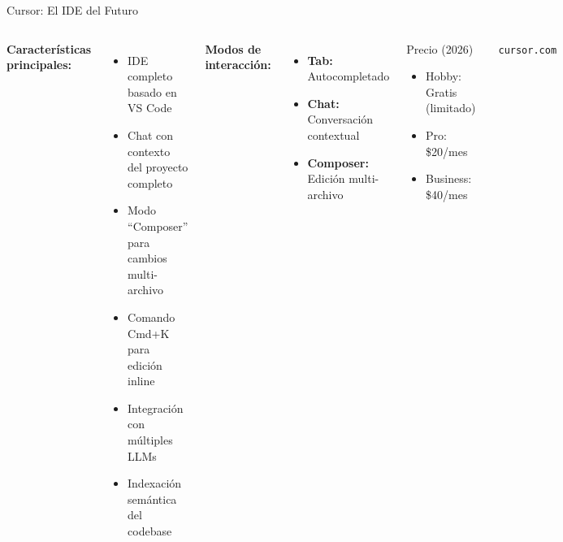 \documentclass[aspectratio=169]{beamer}
\begin{document}
\begin{frame}{Cursor: El IDE del Futuro}
    \begin{columns}
        \textbf{Características principales:}
        \begin{itemize}
            \item IDE completo basado en VS Code
            \item Chat con contexto del proyecto completo
            \item Modo ``Composer'' para cambios multi-archivo
            \item Comando Cmd+K para edición inline
            \item Integración con múltiples LLMs
            \item Indexación semántica del codebase
        \end{itemize}
        
        \vspace{0.3cm}
        \textbf{Modos de interacción:}
        \begin{itemize}
            \item \textbf{Tab:} Autocompletado
            \item \textbf{Chat:} Conversación contextual
            \item \textbf{Composer:} Edición multi-archivo
        \end{itemize}
        
        \begin{block}{Precio (2026)}
            \begin{itemize}
                \item Hobby: Gratis (limitado)
                \item Pro: \$20/mes
                \item Business: \$40/mes
            \end{itemize}
        \end{block}
        
        \vspace{0.3cm}
        \centering
        \faDesktop \ \texttt{cursor.com}
    \end{columns}
\end{frame}
\end{document}

